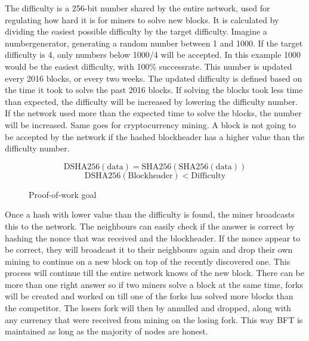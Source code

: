 \documentclass[11pt]{article}
\begin{document}
The difficulty is a 256-bit number shared by the entire network, used for regulating how hard it is for miners to solve new blocks. It is calculated by dividing the easiest possible difficulty by the target difficulty. Imagine a numbergenerator, generating a random number between 1 and 1000. If the target difficulty is 4, only numbers below 1000/4 will be accepted. In this example 1000 would be the easiest difficulty, with 100\% successrate. This number is updated every 2016 blocks, or every two weeks. The updated difficulty is defined based on the time it took to solve the past 2016 blocks. If solving the blocks took less time than expected, the difficulty will be increased by lowering the difficulty number. If the network used more than the expected time to solve the blocks, the number will be increased. Same goes for cryptocurrency mining. A block is not going to be accepted by the network if the hashed blockheader has a higher value than the difficulty number. 

\begin{figure}[h!]
\begin{equation*}
\textrm{DSHA256}(\textrm{data}) = \textrm{SHA256}(\textrm{SHA256}(\textrm{data}))
\end{equation*}
\begin{equation*}
\textrm{DSHA256}(\textrm{Blockheader}) < \textrm{Difficulty}
\end{equation*}
\caption{Proof-of-work goal}
\end{figure}

Once a hash with lower value than the difficulty is found, the miner broadcasts this to the network. The neighbours can easily check if the answer is correct by hashing the nonce that was received and the blockheader. If the nonce appear to be correct, they will broadcast it to their neighbours again and drop their own mining to continue on a new block on top of the recently discovered one. This process will continue till the entire network knows of the new block. There can be more than one right answer so if two miners solve a block at the same time, forks will be created and worked on till one of the forks has solved more blocks than the competitor. The losers fork will then by annulled and dropped, along with any currency that were received from mining on the losing fork. This way BFT is maintained as long as the majority of nodes are honest.
\end{document}
